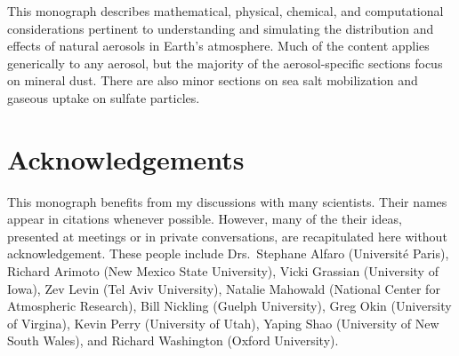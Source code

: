 \documentclass[12pt,twoside]{book}
\begin{document}
This monograph describes mathematical, physical, chemical, and
computational considerations pertinent to understanding and simulating 
the distribution and effects of natural aerosols in Earth's
atmosphere.
Much of the content applies generically to any aerosol, but the
majority of the aerosol-specific sections focus on mineral dust.
There are also minor sections on sea salt mobilization and gaseous
uptake on sulfate particles.

\section[Acknowledgements]{Acknowledgements}\label{sxn:ack}
This monograph benefits from my discussions with many scientists.
Their names appear in citations whenever possible.
However, many of the their ideas, presented at meetings or in private
conversations, are recapitulated here without acknowledgement. 
These people include Drs.\ 
Stephane Alfaro (Universit\'{e} Paris), 
Richard Arimoto (New Mexico State University),
Vicki Grassian (University of Iowa),
Zev Levin (Tel Aviv University),
Natalie Mahowald (National Center for Atmospheric Research), 
Bill Nickling (Guelph University),
Greg Okin (University of Virgina), 
Kevin Perry (University of Utah),
Yaping Shao (University of New South Wales), and 
Richard Washington (Oxford University). 
\end{document}
